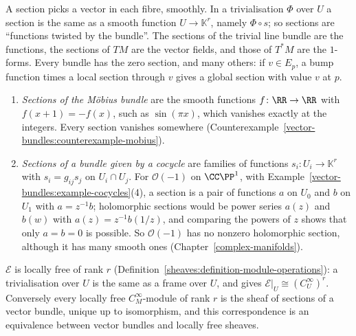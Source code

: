 A section picks a vector in each fibre, smoothly. In a trivialisation $\Phi$ over $U$ a section is the same as a smooth function $U \to \mathbb{K}^r$, namely $\Phi \circ s$; so
sections are ``functions twisted by the bundle''. The sections of the trivial line bundle are the functions, the sections of $TM$ are the vector fields, and those of $T^*M$ are the
$1$-forms. Every bundle has the zero section, and many others: if $v \in E_p$, a bump function times a local section through $v$ gives a global section with value $v$ at $p$.

\begin{example}\label{vector-bundles:example-sections}
\begin{enumerate}
\item \emph{Sections of the M\"obius bundle} are the smooth functions $f \colon \RR \to \RR$ with $f(x + 1) = -f(x)$, such as $\sin(\pi x)$, which vanishes exactly at the integers.
Every section vanishes somewhere (Counterexample~\ref{vector-bundles:counterexample-mobius}).
\item \emph{Sections of a bundle given by a cocycle} are families of functions $s_i \colon U_i \to \mathbb{K}^r$ with $s_i = g_{ij}s_j$ on $U_i \cap U_j$. For $\mathcal{O}(-1)$ on
$\CC\PP^1$, with Example~\ref{vector-bundles:example-cocycles}(4), a section is a pair of functions $a$ on $U_0$ and $b$ on $U_1$ with $a = z^{-1}b$; holomorphic sections would be
power series $a(z)$ and $b(w)$ with $a(z) = z^{-1}b(1/z)$, and comparing the powers of $z$ shows that only $a = b = 0$ is possible. So $\mathcal{O}(-1)$ has no nonzero holomorphic
section, although it has many smooth ones (Chapter~\ref{complex-manifolds}).
\end{enumerate}
\end{example}

\begin{proposition}\label{vector-bundles:proposition-sheaf-of-sections}
$\mathcal{E}$ is locally free of rank $r$ (Definition~\ref{sheaves:definition-module-operations}): a trivialisation over $U$ is the same as a frame over $U$, and gives $\mathcal{E}|_U \cong (C^\infty_U)^r$.
Conversely every locally free $C^\infty_M$-module of rank $r$ is the sheaf of sections of a vector bundle, unique up to isomorphism, and this correspondence is an equivalence between vector bundles and
locally free sheaves.
\end{proposition}

